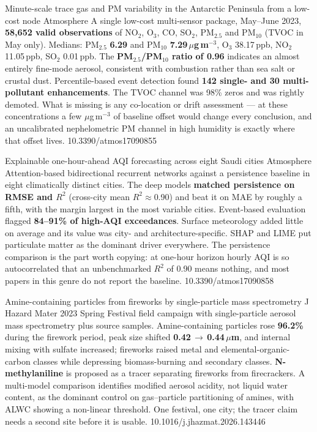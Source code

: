 \documentclass[10pt]{article}
\begin{document}
{Minute-scale trace gas and PM variability in the Antarctic Peninsula from a low-cost node}
{Atmosphere}
{A single low-cost multi-sensor package, May--June 2023, \textbf{58{,}652 valid
observations} of NO$_2$, O$_3$, CO, SO$_2$, PM$_{2.5}$ and PM$_{10}$ (TVOC in May only).
Medians: PM$_{2.5}$ \textbf{6.29} and PM$_{10}$ \textbf{7.29\,$\mu$g\,m$^{-3}$},
O$_3$ 38.17\,ppb, NO$_2$ 11.05\,ppb, SO$_2$ 0.01\,ppb. The
\textbf{PM$_{2.5}$/PM$_{10}$ ratio of 0.96} indicates an almost entirely fine-mode
aerosol, consistent with combustion rather than sea salt or crustal dust. Percentile-based
event detection found \textbf{142 single- and 30 multi-pollutant enhancements}. The TVOC
channel was 98\% zeros and was rightly demoted. What is missing is any co-location or
drift assessment --- at these concentrations a few $\mu$g\,m$^{-3}$ of baseline offset
would change every conclusion, and an uncalibrated nephelometric PM channel in high
humidity is exactly where that offset lives.}
{10.3390/atmos17090855}

{Explainable one-hour-ahead AQI forecasting across eight Saudi cities}
{Atmosphere}
{Attention-based bidirectional recurrent networks against a persistence baseline in eight
climatically distinct cities. The deep models \textbf{matched persistence on RMSE and
$R^2$} (cross-city mean $R^2\approx$0.90) and beat it on MAE by roughly a fifth, with the
margin largest in the most variable cities. Event-based evaluation flagged
\textbf{84--91\% of high-AQI exceedances}. Surface meteorology added little on average and
its value was city- and architecture-specific. SHAP and LIME put particulate matter as the
dominant driver everywhere. The persistence comparison is the part worth copying: at
one-hour horizon hourly AQI is so autocorrelated that an unbenchmarked $R^2$ of 0.90 means
nothing, and most papers in this genre do not report the baseline.}
{10.3390/atmos17090858}

{Amine-containing particles from fireworks by single-particle mass spectrometry}
{J Hazard Mater}
{2023 Spring Festival field campaign with single-particle aerosol mass spectrometry plus
source samples. Amine-containing particles rose \textbf{96.2\%} during the firework
period, peak size shifted \textbf{0.42\,$\to$\,0.44\,$\mu$m}, and internal mixing with
sulfate increased; fireworks raised metal and elemental-organic-carbon classes while
depressing biomass-burning and secondary classes. \textbf{N-methylaniline} is proposed as
a tracer separating fireworks from firecrackers. A multi-model comparison identifies
modified aerosol acidity, not liquid water content, as the dominant control on
gas--particle partitioning of amines, with ALWC showing a non-linear threshold. One
festival, one city; the tracer claim needs a second site before it is usable.}
{10.1016/j.jhazmat.2026.143446}
\end{document}
